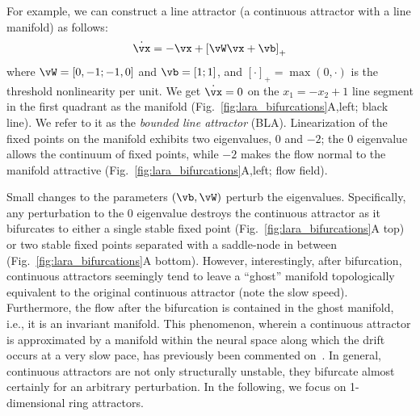 \documentclass{article} %
\newcounter{ct}
\newcommand{\reals}{\mathbb{R}}
\theoremstyle{definition}
\theoremstyle{remark}
\begin{document}
For example, we can construct a line attractor (a continuous attractor with a line manifold) as follows:
\begin{align}\label{eq:TLN}
    \dot{\vx} = -\vx + \left[ \vW \vx + \vb \right]_{+}
\end{align}
where \(\vW = [0, -1; -1, 0]\) and \(\vb = [1; 1]\), and \([\cdot]_{+} = \max(0,\cdot)\) is the threshold nonlinearity per unit.
We get \(\dot{\vx} = 0\) on the \(x_1 = -x_2 + 1\) line segment in the first quadrant as the manifold (Fig.~\ref{fig:lara_bifurcations}A,left; black line).
We refer to it as the \emph{bounded line attractor} (BLA).
Linearization of the fixed points on the manifold exhibits two eigenvalues, \(0\) and \(-2\);
the \(0\) eigenvalue allows the continuum of fixed points, while \(-2\) makes the flow normal to the manifold attractive (Fig.~\ref{fig:lara_bifurcations}A,left; flow field).

Small changes to the parameters \((\vb,\vW)\) perturb the eigenvalues.
Specifically, any perturbation to the \(0\) eigenvalue destroys the continuous attractor as it bifurcates to either
a single stable fixed point (Fig.~\ref{fig:lara_bifurcations}A top) or two stable fixed points separated with a saddle-node in between (Fig.~\ref{fig:lara_bifurcations}A bottom).
However, interestingly, after bifurcation, continuous attractors seemingly tend to leave a ``ghost'' manifold topologically equivalent to the original continuous attractor (note the slow speed).
Furthermore, the flow after the bifurcation is contained in the ghost manifold, i.e., it is an invariant manifold.
This phenomenon, wherein a continuous attractor is approximated by a manifold within the neural space along which the drift occurs at a very slow pace, has previously been commented on~\citep{seung1997learning,mante2013context}.
In general, continuous attractors are not only structurally unstable, they bifurcate almost certainly for an arbitrary perturbation.
In the following, we focus on 1-dimensional ring attractors.
\end{document}
